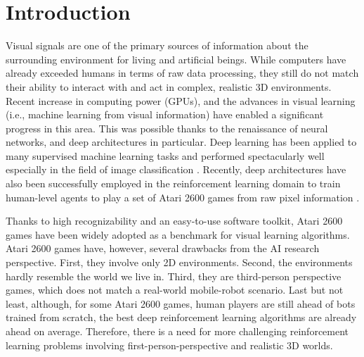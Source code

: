 \documentclass[english,american,conference, balance]{IEEEtran}
\begin{document}
\section{Introduction\label{sec:Introduction}}

\begin{comment}
Paragraph 1:

Establish a territory - importance of the subject, overview

Motivation. At a high level, what is the problem area you are working
in and why is it important? It is important to set the larger context
here. Why is the problem of interest and importance to the larger
community?
\end{comment}

Visual signals are one of the primary sources of information about
the surrounding environment for living and artificial beings. While
computers have already exceeded humans in terms of raw data processing,
they still do not match their ability to interact with and act in
complex, realistic 3D environments. Recent increase in computing power
(GPUs), and the advances in visual learning (i.e., machine learning
from visual information) have enabled a significant progress in this
area. This was possible thanks to the renaissance of neural networks,
and deep architectures in particular. Deep learning has been applied
to many supervised machine learning tasks and performed spectacularly
well especially in the field of image classification \cite{NIPS2012_4824}.
Recently, deep architectures have also been successfully employed
in the reinforcement learning domain to train human-level agents to
play a set of Atari 2600 games from raw pixel information \cite{mnih-dqn-2015}.

\begin{comment}
Paragraph 2:

What is the problem? Oppose an existing assumption, reveal a research
gap, formulate a research question

What is the specific problem considered in this paper? This paragraph
narrows down the topic area of the paper. In the first paragraph you
have established general context and importance. Here you establish
specific context and background.
\end{comment}

Thanks to high recognizability and an easy-to-use software toolkit,
Atari 2600 games have been widely adopted as a benchmark for visual
learning algorithms. Atari 2600 games have, however, several drawbacks
from the AI research perspective. First, they involve only 2D environments.
Second, the environments hardly resemble the world we live in. Third,
they are third-person perspective games, which does not match a real-world
mobile-robot scenario. Last but not least, although, for some Atari
2600 games, human players are still ahead of bots trained from scratch,
the best deep reinforcement learning algorithms are already ahead
on average. Therefore, there is a need for more challenging reinforcement
learning problems involving first-person-perspective and realistic
3D worlds.
\end{document}
